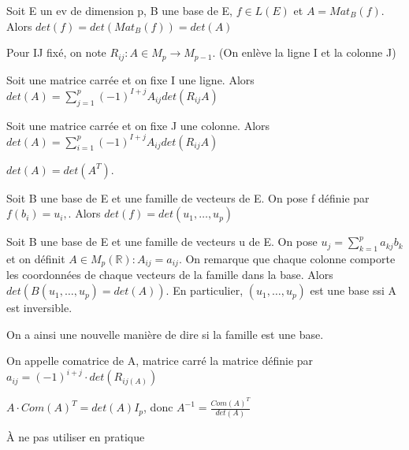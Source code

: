 \documentclass[french]{yLectureNote}
\newcommand{\R}[0]{\mathbb{R}}
\begin{document}
\begin{theorem}
 Soit E un ev de dimension p, B une base de E, \(f\in L(E)\) et \(A = Mat_B(f)\). Alors \(det(f) = det(Mat_B(f)) = det(A)\)
\end{theorem}
Pour IJ fixé, on note \(R_{ij} : A \in M_p \to M_{p-1}\). (On enlève la ligne I et la colonne J)
\begin{proposition}
Soit une matrice carrée et on fixe I une ligne. Alors \(det(A) = \sum_{j=1}^p (-1)^{I+j}A_{ij}det(R_{ij}A)\)
\end{proposition}

\begin{proposition}
Soit une matrice carrée et on fixe J une colonne. Alors \(det(A) = \sum_{i=1}^p (-1)^{I+j}A_{ij}det(R_{ij}A)\)
\end{proposition}
\begin{proposition}
\(det(A) = det(A^T)\).
\end{proposition}
\begin{proposition}
Soit B une base de E et une famille de vecteurs de E. On pose f définie par \(f(b_i) = u_i,\). Alors \(det(f) = det(u_1,\dots, u_p)\)
\end{proposition}
\begin{proposition}[Corollaire ]
Soit B une base de E et une famille de vecteurs u de E. On pose \(u_j = \sum_{k=1}^p a_{kj}b_k\) et on définit \(A\in M_p(\R) : A_{ij} = a_{ij}\). On remarque que chaque colonne comporte les coordonnées de chaque vecteurs de la famille dans la base. Alors \(det(B(u_1,\dots, u_p)=det(A))\). En particulier, \((u_1,\dots, u_p)\) est une base ssi A est inversible.
\end{proposition}
On a ainsi une nouvelle manière de dire si la famille est une base.
\begin{definition}[Comatrice]
On appelle comatrice de A, matrice carré la matrice définie par \(a_{ij} = (-1)^{i+j}\cdot det(R_{ij(A)})\)
\end{definition}
\begin{proposition}
\(A\cdot Com(A)^T = det(A)I_p\), donc \(A^{-1} = \frac{Com(A)^T}{det(A)}\)
\end{proposition}
À ne pas utiliser en pratique
\end{document}
